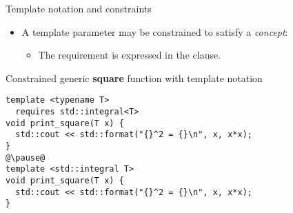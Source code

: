 \begin{frame}[t,fragile]{Template notation and constraints}

\begin{itemize}
  \item A template parameter may be constrained to satisfy a \emph{concept}:
    \begin{itemize}
      \item The requirement is expressed in the  clause.
    \end{itemize}
\end{itemize}

\begin{block}{Constrained generic \textbf{square} function with template notation}
\begin{lstlisting}[escapechar=@]
template <typename T>
  requires std::integral<T>
void print_square(T x) {
  std::cout << std::format("{}^2 = {}\n", x, x*x);
}
@\pause@
template <std::integral T>
void print_square(T x) {
  std::cout << std::format("{}^2 = {}\n", x, x*x);
}
\end{lstlisting}
\end{block}

\end{frame}

